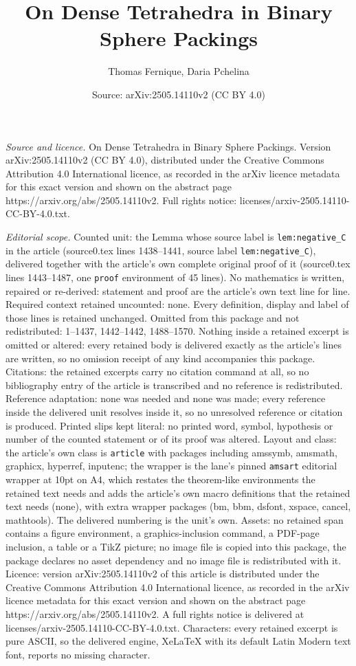 \documentclass[10pt,a4paper]{amsart}
\title[On Dense Tetrahedra in Binary Sphere Packings]{On Dense Tetrahedra in Binary Sphere Packings}
\author{Thomas Fernique, Daria Pchelina}
\date{Source: arXiv:2505.14110v2 (CC BY 4.0)}
\begin{document}
\maketitle

\noindent\emph{Source and licence.} On Dense Tetrahedra in Binary Sphere Packings. Version arXiv:2505.14110v2 (CC BY 4.0), distributed under the Creative Commons Attribution 4.0 International licence, as recorded in the arXiv licence metadata for this exact version and shown on the abstract page https://arxiv.org/abs/2505.14110v2. Full rights notice: licenses/arxiv-2505.14110-CC-BY-4.0.txt.\par\smallskip

\noindent\textit{Editorial scope.} Counted unit: the Lemma whose source label is \texttt{lem:negative\_C} in the article (source0.tex lines 1438--1441, source label \texttt{lem:negative\_C}), delivered together with the article's own complete original proof of it (source0.tex lines 1443--1487, one \texttt{proof} environment of 45 lines). No mathematics is written, repaired or re-derived: statement and proof are the article's own text line for line. Required context retained uncounted: none. Every definition, display and label of those lines is retained unchanged. Omitted from this package and not redistributed: 1--1437, 1442--1442, 1488--1570. Nothing inside a retained excerpt is omitted or altered: every retained body is delivered exactly as the article's lines are written, so no omission receipt of any kind accompanies this package. Citations: the retained excerpts carry no citation command at all, so no bibliography entry of the article is transcribed and no reference is redistributed. Reference adaptation: none was needed and none was made; every reference inside the delivered unit resolves inside it, so no unresolved reference or citation is produced. Printed slips kept literal: no printed word, symbol, hypothesis or number of the counted statement or of its proof was altered. Layout and class: the article's own class is \texttt{article} with packages including amssymb, amsmath, graphicx, hyperref, inputenc; the wrapper is the lane's pinned \texttt{amsart} editorial wrapper at 10pt on A4, which restates the theorem-like environments the retained text needs and adds the article's own macro definitions that the retained text needs (none), with extra wrapper packages (bm, bbm, dsfont, xspace, cancel, mathtools). The delivered numbering is the unit's own. Assets: no retained span contains a figure environment, a graphics-inclusion command, a PDF-page inclusion, a table or a TikZ picture; no image file is copied into this package, the package declares no asset dependency and no image file is redistributed with it. Licence: version arXiv:2505.14110v2 of this article is distributed under the Creative Commons Attribution 4.0 International licence, as recorded in the arXiv licence metadata for this exact version and shown on the abstract page https://arxiv.org/abs/2505.14110v2. A full rights notice is delivered at licenses/arxiv-2505.14110-CC-BY-4.0.txt. Characters: every retained excerpt is pure ASCII, so the delivered engine, XeLaTeX with its default Latin Modern text font, reports no missing character.
\end{document}
